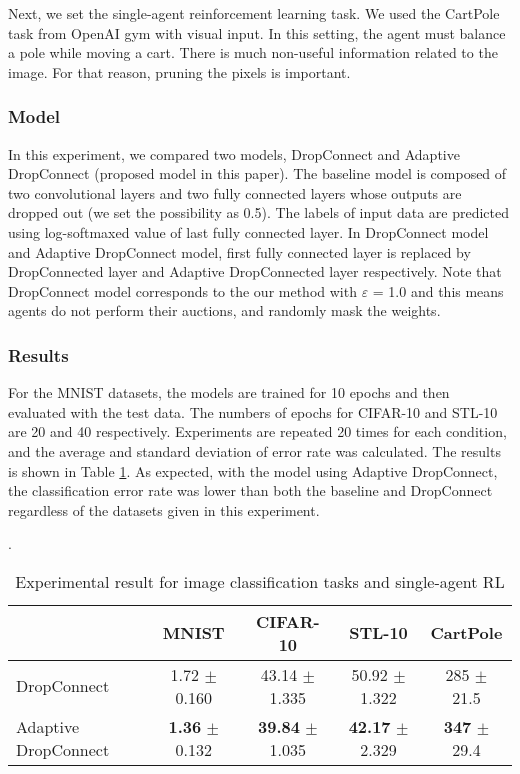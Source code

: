 Next, we set the single-agent reinforcement learning task.
We used the CartPole task from OpenAI gym with visual input.
In this setting, the agent must balance a pole while moving a cart.
There is much non-useful information related to the image. For that reason, pruning the pixels is important.

\subsubsection{Model}
In this experiment, we compared two models, DropConnect and Adaptive DropConnect (proposed model in this paper). The baseline model is composed of two convolutional layers and two fully connected layers whose outputs are dropped out (we set the possibility as 0.5). The labels of input data are predicted using log-softmaxed value of last fully connected layer. In DropConnect model and Adaptive DropConnect model, first fully connected layer is replaced by DropConnected layer  and Adaptive DropConnected layer respectively. Note that DropConnect model corresponds to the our method with $\varepsilon$ = 1.0 and this means agents do not perform their auctions, and randomly mask the weights.

\subsubsection{Results}
For the MNIST datasets, the models are trained for 10 epochs and then evaluated with the test data. The numbers of epochs for CIFAR-10 and STL-10 are 20 and 40 respectively. Experiments are repeated 20 times for each condition, and the average and standard deviation of  error rate was calculated. The results is shown in Table \ref{tbl:cls}. As expected, with the model using Adaptive DropConnect, the classification error rate was lower than both the baseline and DropConnect regardless of the datasets given in this experiment.


\begin{table}[h]
	\caption{ Experimental result for image classification tasks and single-agent RL }\label{tbl:cls}. 
\centering
\begin{tabular}{l|ccc|c}
\hline
		& MNIST & CIFAR-10 & STL-10 & CartPole \\
\hline
		DropConnect \citep{wan2013regularization}	&	1.72 $\pm$ 0.160	&	43.14 $\pm$ 1.335	&	50.92 $\pm$ 1.322 & 285 $\pm$ 21.5 \\
		Adaptive DropConnect	&	\textbf{1.36} $\pm$ 0.132	&	\textbf{39.84} $\pm$ 1.035	&	\textbf{42.17} $\pm$ 2.329 & \textbf{347} $\pm$ 29.4 \\
\hline
\end{tabular}
\end{table}

